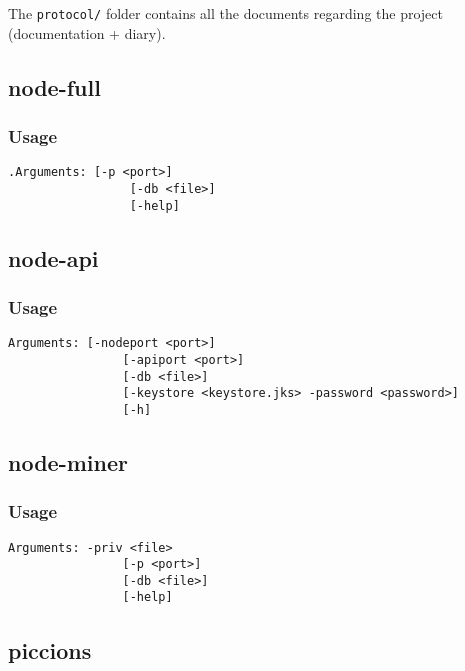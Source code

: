 \documentclass[../documentation.tex]{subfiles}
\begin{document}
The \texttt{protocol/} folder contains all the documents regarding
the project (documentation + diary).

\subsection{node-full}

\subsubsection{Usage}

\begin{lstlisting}[style=generic]
     .Arguments: [-p <port>]
                 [-db <file>]
                 [-help]
\end{lstlisting}

\subsection{node-api}

\subsubsection{Usage}

\begin{lstlisting}[style=generic]
     Arguments: [-nodeport <port>]
                [-apiport <port>]
                [-db <file>]
                [-keystore <keystore.jks> -password <password>]
                [-h]
\end{lstlisting}

\subsection{node-miner}

\subsubsection{Usage}

\begin{lstlisting}[style=generic]
     Arguments: -priv <file>
                [-p <port>]
                [-db <file>]
                [-help]
\end{lstlisting}

\subsection{piccions}
\end{document}
